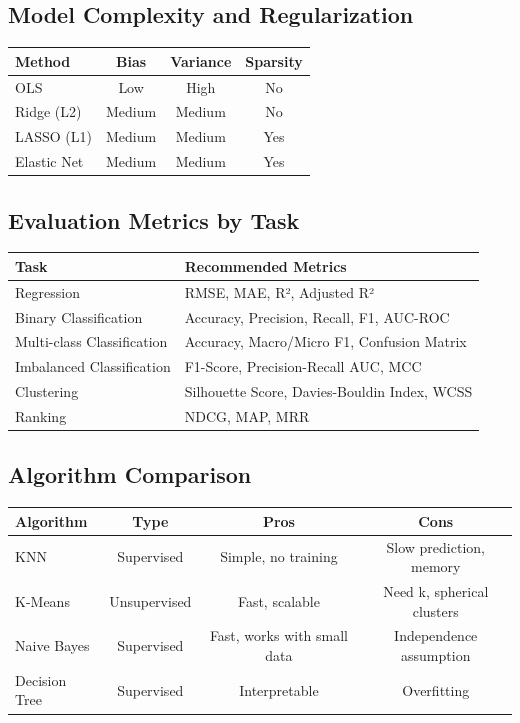 \documentclass[11pt]{article}
\begin{document}
\subsection{Model Complexity and Regularization}

\begin{center}
\small
\begin{tabular}{|l|c|c|c|}
\hline
\textbf{Method} & \textbf{Bias} & \textbf{Variance} & \textbf{Sparsity} \\
\hline
OLS & Low & High & No \\
Ridge (L2) & Medium & Medium & No \\
LASSO (L1) & Medium & Medium & Yes \\
Elastic Net & Medium & Medium & Yes \\
\hline
\end{tabular}
\end{center}

\subsection{Evaluation Metrics by Task}

\begin{center}
\small
\begin{tabular}{|l|p{10cm}|}
\hline
\textbf{Task} & \textbf{Recommended Metrics} \\
\hline
Regression & RMSE, MAE, R², Adjusted R² \\
Binary Classification & Accuracy, Precision, Recall, F1, AUC-ROC \\
Multi-class Classification & Accuracy, Macro/Micro F1, Confusion Matrix \\
Imbalanced Classification & F1-Score, Precision-Recall AUC, MCC \\
Clustering & Silhouette Score, Davies-Bouldin Index, WCSS \\
Ranking & NDCG, MAP, MRR \\
\hline
\end{tabular}
\end{center}

\subsection{Algorithm Comparison}

\begin{center}
\small
\begin{tabular}{|l|c|c|c|}
\hline
\textbf{Algorithm} & \textbf{Type} & \textbf{Pros} & \textbf{Cons} \\
\hline
KNN & Supervised & Simple, no training & Slow prediction, memory \\
K-Means & Unsupervised & Fast, scalable & Need k, spherical clusters \\
Naive Bayes & Supervised & Fast, works with small data & Independence assumption \\
Decision Tree & Supervised & Interpretable & Overfitting \\
\hline
\end{tabular}
\end{center}
\end{document}
